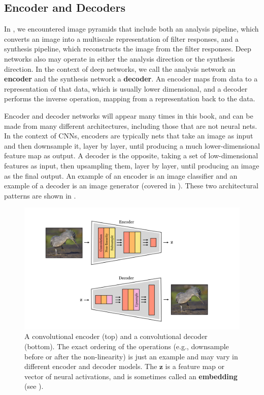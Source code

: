 \subsection{Encoder and Decoders}
In \chap{\ref{chapter:image_pyramids}}, we encountered image pyramids that include both an analysis pipeline, which converts an image into a multiscale representation of filter responses, and a synthesis pipeline, which reconstructs the image from the filter responses. Deep networks also may operate in either the analysis direction or the synthesis direction. In the context of deep networks, we call the analysis network an \textbf{encoder} and the synthesis network a \textbf{decoder}. An encoder maps from data to a representation of that data, which is usually lower dimensional, and a decoder performs the inverse operation, mapping from a representation back to the data. %

Encoder and decoder networks will appear many times in this book, and can be made from many different architectures, including those that are not neural nets. In the context of CNNs, encoders are typically nets that take an image as input and then downsample it, layer by layer, until producing a much lower-dimensional feature map as output. A decoder is the opposite, taking a set of low-dimensional features as input, then upsampling them, layer by layer, until producing an image as the final output. An example of an encoder is an image classifier and an example of a decoder is an image generator (covered in \chap{\ref{chapter:generative_models}}). These two architectural patterns are shown in \fig{\ref{fig:convolutional_neural_nets:encoders_and_decoders}}.
\begin{figure}[h]
    \centerline{
    \includegraphics[width=0.75\linewidth]{./figures/convolutional_neural_nets/encoders_and_decoders.pdf}
    }
    \caption{A convolutional encoder (top) and a convolutional decoder (bottom). The exact ordering of the operations (e.g., downsample before or after the non-linearity) is just an example and may vary in different encoder and decoder models. The $\mathbf{z}$ is a feature map or vector of neural activations, and is sometimes called an \textbf{embedding} (see \chap{\ref{chapter:representation_learning}}).} 
    \label{fig:convolutional_neural_nets:encoders_and_decoders}
\end{figure}

